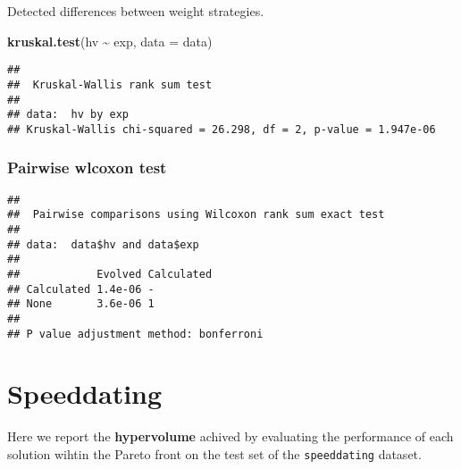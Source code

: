 \documentclass[
]{book}
\newenvironment{Shaded}{\begin{snugshade}}{\end{snugshade}}
\newcommand{\AttributeTok}[1]{\textcolor[rgb]{0.13,0.29,0.53}{#1}}
\newcommand{\ConstantTok}[1]{\textcolor[rgb]{0.56,0.35,0.01}{#1}}
\newcommand{\FunctionTok}[1]{\textcolor[rgb]{0.13,0.29,0.53}{\textbf{#1}}}
\newcommand{\NormalTok}[1]{#1}
\newcommand{\SpecialCharTok}[1]{\textcolor[rgb]{0.81,0.36,0.00}{\textbf{#1}}}
\newcommand{\StringTok}[1]{\textcolor[rgb]{0.31,0.60,0.02}{#1}}
\begin{document}
Detected differences between weight strategies.

\begin{Shaded}
\begin{Highlighting}[]
\FunctionTok{kruskal.test}\NormalTok{(hv }\SpecialCharTok{\textasciitilde{}}\NormalTok{ exp, }\AttributeTok{data =}\NormalTok{ data)}
\end{Highlighting}
\end{Shaded}

\begin{verbatim}
## 
##  Kruskal-Wallis rank sum test
## 
## data:  hv by exp
## Kruskal-Wallis chi-squared = 26.298, df = 2, p-value = 1.947e-06
\end{verbatim}

\hypertarget{pairwise-wlcoxon-test-8}{%
\subsection{Pairwise wlcoxon test}\label{pairwise-wlcoxon-test-8}}

\begin{Shaded}
\end{Shaded}

\begin{verbatim}
## 
##  Pairwise comparisons using Wilcoxon rank sum exact test 
## 
## data:  data$hv and data$exp 
## 
##            Evolved Calculated
## Calculated 1.4e-06 -         
## None       3.6e-06 1         
## 
## P value adjustment method: bonferroni
\end{verbatim}

\hypertarget{speeddating}{%
\chapter{Speeddating}\label{speeddating}}

Here we report the \textbf{hypervolume} achived by evaluating the performance of each solution wihtin the Pareto front on the test set of the \texttt{speeddating} dataset.
\end{document}
